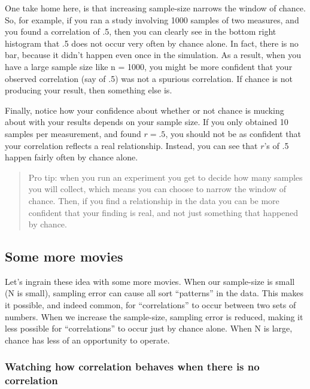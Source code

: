 \documentclass[
]{book}
\begin{document}
One take home here, is that increasing sample-size narrows the window of chance. So, for example, if you ran a study involving 1000 samples of two measures, and you found a correlation of .5, then you can clearly see in the bottom right histogram that .5 does not occur very often by chance alone. In fact, there is no bar, because it didn't happen even once in the simulation. As a result, when you have a large sample size like n = 1000, you might be more confident that your observed correlation (say of .5) was not a spurious correlation. If chance is not producing your result, then something else is.

Finally, notice how your confidence about whether or not chance is mucking about with your results depends on your sample size. If you only obtained 10 samples per measurement, and found \(r = .5\), you should not be as confident that your correlation reflects a real relationship. Instead, you can see that \(r\)'s of .5 happen fairly often by chance alone.

\begin{quote}
Pro tip: when you run an experiment you get to decide how many samples you will collect, which means you can choose to narrow the window of chance. Then, if you find a relationship in the data you can be more confident that your finding is real, and not just something that happened by chance.
\end{quote}

\hypertarget{some-more-movies}{%
\subsection{Some more movies}\label{some-more-movies}}

Let's ingrain these idea with some more movies. When our sample-size is small (N is small), sampling error can cause all sort ``patterns'' in the data. This makes it possible, and indeed common, for ``correlations'' to occur between two sets of numbers. When we increase the sample-size, sampling error is reduced, making it less possible for ``correlations'' to occur just by chance alone. When N is large, chance has less of an opportunity to operate.

\hypertarget{watching-how-correlation-behaves-when-there-is-no-correlation}{%
\subsubsection{Watching how correlation behaves when there is no correlation}\label{watching-how-correlation-behaves-when-there-is-no-correlation}}
\end{document}
